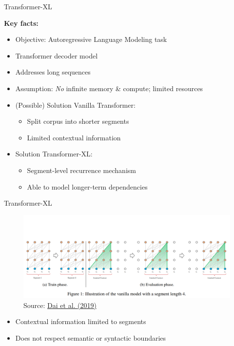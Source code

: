 
\begin{vbframe}{Transformer-XL}

\vfill

\textbf{Key facts:}

\begin{itemize}
	\item Objective: Autoregressive Language Modeling task
	\item Transformer decoder model
	\item Addresses long sequences
	\item Assumption: \textit{No} infinite memory \& compute; limited resources
	\item (Possible) Solution Vanilla Transformer:
		\begin{itemize}
			\item Split corpus into shorter segments
			\item Limited contextual information
		\end{itemize}
	\item Solution Transformer-XL:
		\begin{itemize}
			\item Segment-level recurrence mechanism
			\item Able to model longer-term dependencies
		\end{itemize}
\end{itemize}

\vfill

\end{vbframe}


\begin{vbframe}{Transformer-XL}

\begin{figure}
\centering
\includegraphics[width = 11.5cm]{figure/vanilla-trafo-seq4.png}\\ 
\footnotesize{Source:} \href{https://aclanthology.org/P19-1285.pdf}{\footnotesize Dai et al. (2019)}
\end{figure}

\begin{itemize}
		\item Contextual information limited to segments
		\item Does not respect semantic or syntactic boundaries
\end{itemize}

\end{vbframe}

